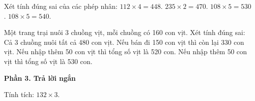 \begin{ex} %
Xét tính đúng sai của các phép nhân:
\choiceTF
{\True $112 \times 4 = 448$.}
{\True $235 \times 2 = 470$.}
{$108 \times 5 = 530$.}
{\True $108 \times 5 = 540$.}
\end{ex}

\begin{ex} %
Một trang trại nuôi 3 chuồng vịt, mỗi chuồng có 160 con vịt. Xét tính đúng sai:
\choiceTF
{\True Cả 3 chuồng nuôi tất cả 480 con vịt.}
{\True Nếu bán đi 150 con vịt thì còn lại 330 con vịt.}
{Nếu nhập thêm 50 con vịt thì tổng số vịt là 520 con.}
{\True Nếu nhập thêm 50 con vịt thì tổng số vịt là 530 con.}
\end{ex}

\textbf{Phần 3. Trả lời ngắn}

\begin{ex} %
Tính tích: $132 \times 3$.
\end{ex}

